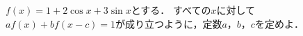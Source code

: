 \documentclass[../../main.tex]{subfiles}
\begin{document}
$f(x)=1+2\cos x+3\sin x$とする．
すべての$x$に対して$af(x)+bf(x-c)=1$が成り立つように，定数$a$，$b$，$c$を定めよ．
\end{document}
